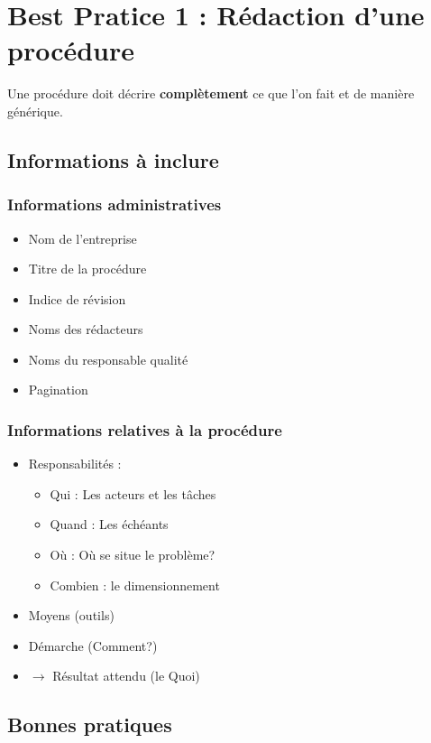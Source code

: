 \section{Best Pratice 1 : Rédaction d'une procédure}

Une procédure doit décrire \textbf{complètement} ce que l'on fait et de manière générique.

\subsection{Informations à inclure}
  \subsubsection{Informations administratives}
    \begin{itemize}
      \item Nom de l'entreprise
      \item Titre de la procédure
      \item Indice de révision
      \item Noms des rédacteurs
      \item Noms du responsable qualité
      \item Pagination
    \end{itemize}
  \subsubsection{Informations relatives à la procédure}
    \begin{itemize}             
      \item Responsabilités : 
        \begin{itemize}             
          \item Qui : Les acteurs et les tâches
          \item Quand : Les échéants
          \item Où : Où se situe le problème?
          \item Combien : le dimensionnement\\
        \end{itemize}
      \item Moyens (outils)
      \item Démarche (Comment?)
      \item $\rightarrow$ Résultat attendu (le Quoi)
     \end{itemize}
     
\subsection{Bonnes pratiques}

